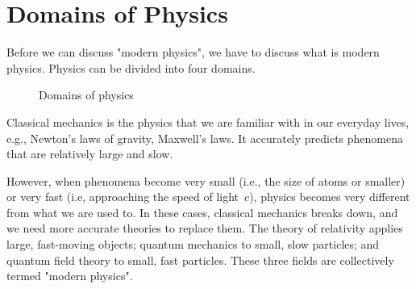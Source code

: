 \section{Domains of Physics}

Before we can discuss "modern physics",
we have to discuss what is modern physics.
Physics can be divided into four domains.

\begin{figure}[ht]
    \resizebox{\linewidth}{!}{}
    \caption{Domains of physics}
\end{figure}

Classical mechanics is the physics
that we are familiar with in our everyday lives,
e.g., Newton's laws of gravity, Maxwell's laws.
It accurately predicts phenomena that are relatively large and slow.

However, when phenomena become very small
(i.e., the size of atoms or smaller)
or very fast (i.e, approaching the speed of light~\(c\)),
physics becomes very different from what we are used to.
In these cases, classical mechanics breaks down,
and we need more accurate theories to replace them.
The theory of relativity applies large, fast-moving objects;
quantum mechanics to small, slow particles;
and quantum field theory to small, fast particles.
These three fields are collectively termed "modern physics".
